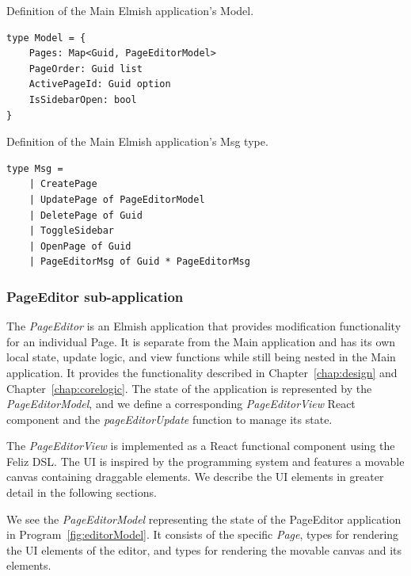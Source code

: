 \begin{listing}[htbp]
	\caption{Definition of the Main Elmish application's Model.}
	\label{fig:appmodel}
	\begin{lstlisting}
type Model = {
    Pages: Map<Guid, PageEditorModel>
    PageOrder: Guid list
    ActivePageId: Guid option
    IsSidebarOpen: bool
}
    \end{lstlisting}
\end{listing}

\begin{listing}[htbp]
	\caption{Definition of the Main Elmish application's Msg type.}
	\label{fig:appMsg}
	\begin{lstlisting}
type Msg =
    | CreatePage
    | UpdatePage of PageEditorModel
    | DeletePage of Guid
    | ToggleSidebar
    | OpenPage of Guid
    | PageEditorMsg of Guid * PageEditorMsg
    \end{lstlisting}
\end{listing}

\subsubsection{PageEditor sub-application}

The \emph{PageEditor} is an Elmish application that provides modification functionality for an individual Page.
It is separate from the Main application and has its own local state, update logic, and view functions while still being nested in the Main application.
It provides the functionality described in Chapter~\ref{chap:design} and Chapter~\ref{chap:corelogic}.
The state of the application is represented by the \emph{PageEditorModel}, and we define a corresponding \emph{PageEditorView} React component and the \emph{pageEditorUpdate} function to manage its state.

The \emph{PageEditorView} is implemented as a React functional component using the Feliz DSL.
The UI is inspired by the \citet{darklang} programming system and features a movable canvas containing draggable elements.
We describe the UI elements in greater detail in the following sections.

We see the \emph{PageEditorModel} representing the state of the PageEditor application in Program~\ref{fig:editorModel}.
It consists of the specific \emph{Page}, types for rendering the UI elements of the editor, and types for rendering the movable canvas and its elements.

